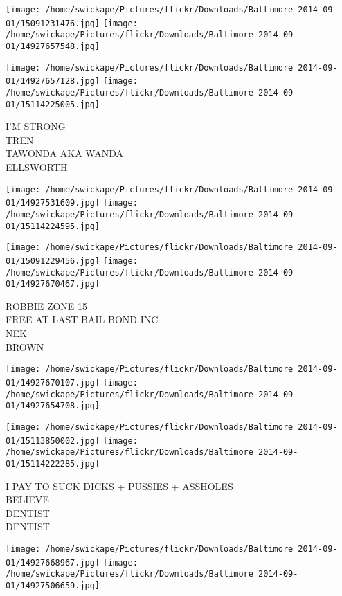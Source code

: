 \documentclass[10pt,letterpaper]{article}
\begin{document}
\texttt{[image: /home/swickape/Pictures/flickr/Downloads/Baltimore 2014-09-01/15091231476.jpg]}
\texttt{[image: /home/swickape/Pictures/flickr/Downloads/Baltimore 2014-09-01/14927657548.jpg]}

\texttt{[image: /home/swickape/Pictures/flickr/Downloads/Baltimore 2014-09-01/14927657128.jpg]}
\texttt{[image: /home/swickape/Pictures/flickr/Downloads/Baltimore 2014-09-01/15114225005.jpg]}

I'M STRONG\\
TREN\\
TAWONDA AKA WANDA\\
ELLSWORTH\\
\pagebreak

\texttt{[image: /home/swickape/Pictures/flickr/Downloads/Baltimore 2014-09-01/14927531609.jpg]}
\texttt{[image: /home/swickape/Pictures/flickr/Downloads/Baltimore 2014-09-01/15114224595.jpg]}

\texttt{[image: /home/swickape/Pictures/flickr/Downloads/Baltimore 2014-09-01/15091229456.jpg]}
\texttt{[image: /home/swickape/Pictures/flickr/Downloads/Baltimore 2014-09-01/14927670467.jpg]}

ROBBIE ZONE 15\\
FREE AT LAST BAIL BOND INC\\
NEK\\
BROWN\\
\pagebreak

\texttt{[image: /home/swickape/Pictures/flickr/Downloads/Baltimore 2014-09-01/14927670107.jpg]}
\texttt{[image: /home/swickape/Pictures/flickr/Downloads/Baltimore 2014-09-01/14927654708.jpg]}

\texttt{[image: /home/swickape/Pictures/flickr/Downloads/Baltimore 2014-09-01/15113850002.jpg]}
\texttt{[image: /home/swickape/Pictures/flickr/Downloads/Baltimore 2014-09-01/15114222285.jpg]}

I PAY TO SUCK DICKS + PUSSIES + ASSHOLES\\
BELIEVE\\
DENTIST\\
DENTIST\\
\pagebreak

\texttt{[image: /home/swickape/Pictures/flickr/Downloads/Baltimore 2014-09-01/14927668967.jpg]}
\texttt{[image: /home/swickape/Pictures/flickr/Downloads/Baltimore 2014-09-01/14927506659.jpg]}
\end{document}
